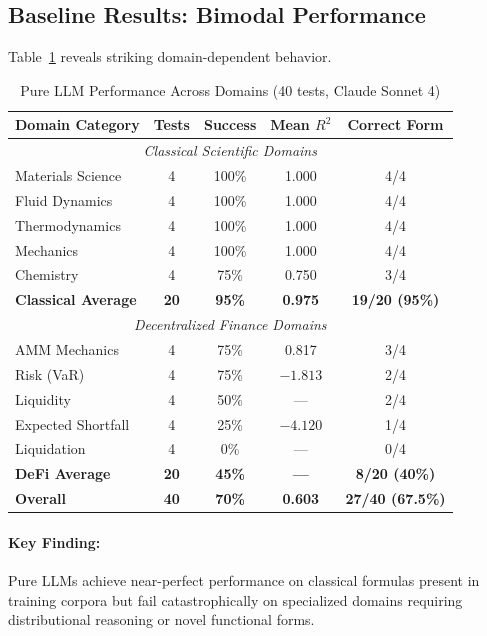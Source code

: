 \documentclass[twoside,11pt]{article}
\begin{document}
\subsection{Baseline Results: Bimodal Performance}

Table~\ref{tab:baseline_llm} reveals striking domain-dependent behavior\citep{kambhampati2024llms}.

\begin{table}[htbp]
\centering
\caption{Pure LLM Performance Across Domains (40 tests, Claude Sonnet 4)}
\label{tab:baseline_llm}
\begin{tabular}{@{}lcccc@{}}
\toprule
\textbf{Domain Category} & \textbf{Tests} & \textbf{Success} & \textbf{Mean $R^2$} & \textbf{Correct Form} \\
\midrule
\multicolumn{5}{c}{\textit{Classical Scientific Domains}} \\\citep{virtanen2020scipy}
\midrule
Materials Science & 4 & 100\% & 1.000 & 4/4 \\
Fluid Dynamics & 4 & 100\% & 1.000 & 4/4 \\
Thermodynamics & 4 & 100\% & 1.000 & 4/4 \\
Mechanics & 4 & 100\% & 1.000 & 4/4 \\
Chemistry & 4 & 75\% & 0.750 & 3/4 \\
\midrule
\textbf{Classical Average} & \textbf{20} & \textbf{95\%} & \textbf{0.975} & \textbf{19/20 (95\%)} \\
\midrule
\multicolumn{5}{c}{\textit{Decentralized Finance Domains}} \\
\midrule
AMM Mechanics & 4 & 75\% & 0.817 & 3/4 \\
Risk (VaR) & 4 & 75\% & $-1.813$ & 2/4 \\
Liquidity & 4 & 50\% & --- & 2/4 \\
Expected Shortfall & 4 & 25\% & $-4.120$ & 1/4 \\
Liquidation & 4 & 0\% & --- & 0/4 \\
\midrule
\textbf{DeFi Average} & \textbf{20} & \textbf{45\%} & \textbf{---} & \textbf{8/20 (40\%)} \\
\midrule
\midrule
\textbf{Overall} & \textbf{40} & \textbf{70\%} & \textbf{0.603} & \textbf{27/40 (67.5\%)} \\
\bottomrule
\end{tabular}
\end{table}

\paragraph{Key Finding:} Pure LLMs achieve near-perfect performance on classical formulas present in training corpora but fail catastrophically on specialized domains requiring distributional reasoning or novel functional forms\citep{kambhampati2024llms}\citep{lewkowycz2022minerva}.
\end{document}

